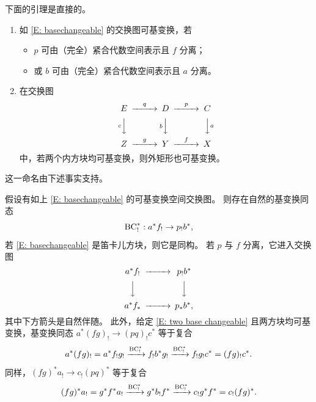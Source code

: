 下面的引理是直接的。
\begin{lem}
\label{L: criterion basechangeable}
\begin{enumerate}
\item 如 \eqref{E: basechangeable} 的交换图可基变换，若
\begin{itemize}
\item $p$ 可由（完全）紧合代数空间表示且 $f$ 分离；
\item 或 $b$ 可由（完全）紧合代数空间表示且 $a$ 分离。
\end{itemize}
\item 在交换图
\begin{equation}
\label{E: two base changeable}
\begin{CD}
E@>q>>D@>p>>C\\
@VcVV@VbVV@VVaV\\
Z@>g>>Y@>f>>X
\end{CD}
\end{equation}
中，若两个内方块均可基变换，则外矩形也可基变换。
\end{enumerate}
\end{lem}

这一命名由下述事实支持。

\begin{lem}
\label{L:proper base change}
假设有如上 \eqref{E: basechangeable} 的可基变换空间交换图。
则存在自然的基变换同态
\begin{equation}
\label{E: base change isom}
\operatorname{BC}^*_!: a^*f_!\to p_!b^*,
\end{equation}
若 \eqref{E: basechangeable} 是笛卡儿方块，则它是同构。
若 $p$ 与 $f$ 分离，它进入交换图
\[\begin{CD}
a^*f_!@>>> p_!b^*\\
@VVV@VVV\\
a^*f_*@>>>p_*b^*,
\end{CD}\]
其中下方箭头是自然伴随。
此外，给定 \eqref{E: two base changeable} 且两方块均可基变换，基变换同态 $a^*(fg)_!\to (pq)_!c^*$ 等于复合
$$a^*(fg)_!=a^*f_!g_!\xrightarrow{\operatorname{BC}_!^*} f_!b^*g_!\xrightarrow{\operatorname{BC}_!^*} f_!g_!c^*=(fg)_!c^*.$$
同样，$(fg)^*a_!\to c_!(pq)^*$ 等于复合
$$(fg)^*a_!=g^*f^*a_!\xrightarrow{\operatorname{BC}_!^*} g^*b_!f^*\xrightarrow{\operatorname{BC}_!^*} c_!g^*f^*=c_!(fg)^*.$$
\end{lem}

